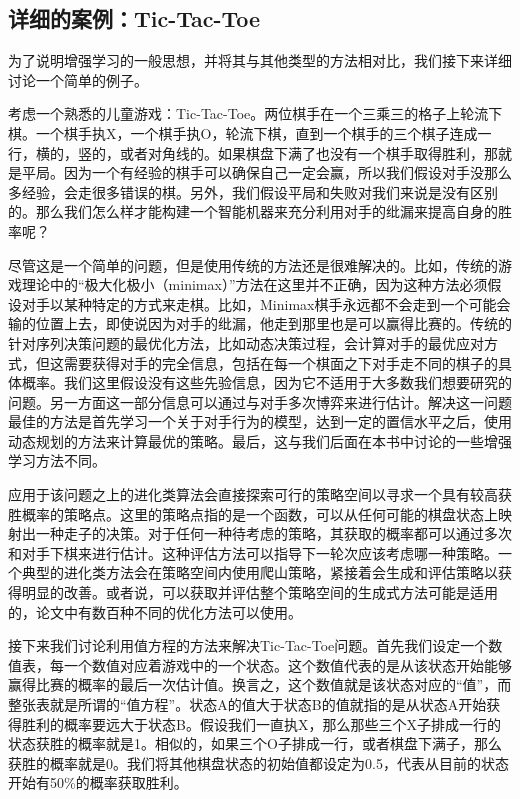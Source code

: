 \documentclass{ctexart}
\begin{document}
        \subsection{详细的案例：Tic-Tac-Toe}
            为了说明增强学习的一般思想，并将其与其他类型的方法相对比，我们接下来详细讨论一个简单的例子。

            考虑一个熟悉的儿童游戏：Tic-Tac-Toe。两位棋手在一个三乘三的格子上轮流下棋。一个棋手执X，一个棋手执O，轮流下棋，直到一个棋手的三个棋子连成一行，横的，竖的，或者对角线的。如果棋盘下满了也没有一个棋手取得胜利，那就是平局。因为一个有经验的棋手可以确保自己一定会赢，所以我们假设对手没那么多经验，会走很多错误的棋。另外，我们假设平局和失败对我们来说是没有区别的。那么我们怎么样才能构建一个智能机器来充分利用对手的纰漏来提高自身的胜率呢？

            尽管这是一个简单的问题，但是使用传统的方法还是很难解决的。比如，传统的游戏理论中的“极大化极小（minimax）”方法在这里并不正确，因为这种方法必须假设对手以某种特定的方式来走棋。比如，Minimax棋手永远都不会走到一个可能会输的位置上去，即使说因为对手的纰漏，他走到那里也是可以赢得比赛的。传统的针对序列决策问题的最优化方法，比如动态决策过程，会计算对手的最优应对方式，但这需要获得对手的完全信息，包括在每一个棋面之下对手走不同的棋子的具体概率。我们这里假设没有这些先验信息，因为它不适用于大多数我们想要研究的问题。另一方面这一部分信息可以通过与对手多次博弈来进行估计。解决这一问题最佳的方法是首先学习一个关于对手行为的模型，达到一定的置信水平之后，使用动态规划的方法来计算最优的策略。最后，这与我们后面在本书中讨论的一些增强学习方法不同。

            应用于该问题之上的进化类算法会直接探索可行的策略空间以寻求一个具有较高获胜概率的策略点。这里的策略点指的是一个函数，可以从任何可能的棋盘状态上映射出一种走子的决策。对于任何一种待考虑的策略，其获取的概率都可以通过多次和对手下棋来进行估计。这种评估方法可以指导下一轮次应该考虑哪一种策略。一个典型的进化类方法会在策略空间内使用爬山策略，紧接着会生成和评估策略以获得明显的改善。或者说，可以获取并评估整个策略空间的生成式方法可能是适用的，论文中有数百种不同的优化方法可以使用。

            接下来我们讨论利用值方程的方法来解决Tic-Tac-Toe问题。首先我们设定一个数值表，每一个数值对应着游戏中的一个状态。这个数值代表的是从该状态开始能够赢得比赛的概率的最后一次估计值。换言之，这个数值就是该状态对应的“值”，而整张表就是所谓的“值方程”。状态A的值大于状态B的值就指的是从状态A开始获得胜利的概率要远大于状态B。假设我们一直执X，那么那些三个X子排成一行的状态获胜的概率就是1。相似的，如果三个O子排成一行，或者棋盘下满子，那么获胜的概率就是0。我们将其他棋盘状态的初始值都设定为0.5，代表从目前的状态开始有50\%的概率获取胜利。
\end{document}
